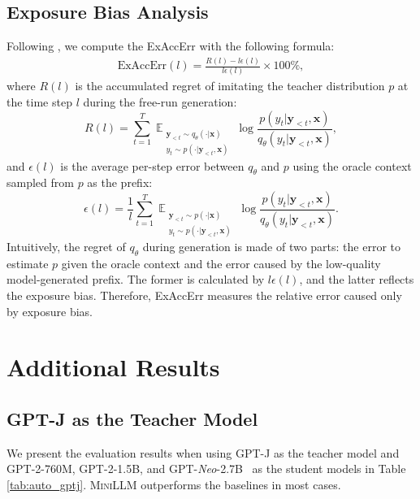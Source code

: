 \documentclass{article}
\def\expct{\mathop{\mathbb{E}}}
\def\pst{q_{\theta}(y_t | \by_{<t}, \bx)}
\def\ptt{p(y_t | \by_{<t}, \bx)}
\def\ps{q_\theta}
\def\pt{p}
\def\bx{\bm{x}}
\def\by{\bm{y}}
\begin{document}
\subsection{Exposure Bias Analysis}
\label{app:eb}
Following \cite{eb_measure}, we compute the ExAccErr with the following formula:
\begin{align}
    \text{ExAccErr} (l)= \frac{R(l) - l\epsilon(l)}{l\epsilon(l)} \times 100\%,
\end{align}
where $R(l)$ is the accumulated regret of imitating the teacher distribution $p$ at the time step $l$ during the free-run generation:
\begin{equation}
    R(l) = \sum_{t=1}^T\expct_{\substack{\by_{<t} \sim \ps(\cdot | \bx) \\ y_t \sim \pt(\cdot | \by_{<t}, \bx) }} \log \frac{\ptt}{\pst},
\end{equation}
and $\epsilon(l)$ is the average per-step error between $\ps$ and $\pt$ using the oracle context sampled from $\pt$ as the prefix:
\begin{equation}
    \epsilon(l) = \frac{1}{l} \sum_{t=1}^T\expct_{\substack{\by_{<t} \sim p(\cdot | \bx) \\ y_t \sim \pt(\cdot | \by_{<t}, \bx) }} \log \frac{\ptt}{\pst}.
\end{equation}
Intuitively, the regret of $\ps$ during generation is made of two parts: the error to estimate $\pt$ given the oracle context and the error caused by the low-quality model-generated prefix. The former is calculated by $l\epsilon(l)$, and the latter reflects the exposure bias. Therefore, ExAccErr measures the relative error caused only by exposure bias.


\section{Additional Results}

\subsection{GPT-J as the Teacher Model}
\label{app:res_gptj}
We present the evaluation results when using GPT-J as the teacher model and GPT-2-760M, GPT-2-1.5B, and GPT-\textit{Neo}-2.7B~\citep{gpt-neo} as the student models in Table \ref{tab:auto_gptj}. \textsc{MiniLLM} outperforms the baselines in most cases.
\end{document}

